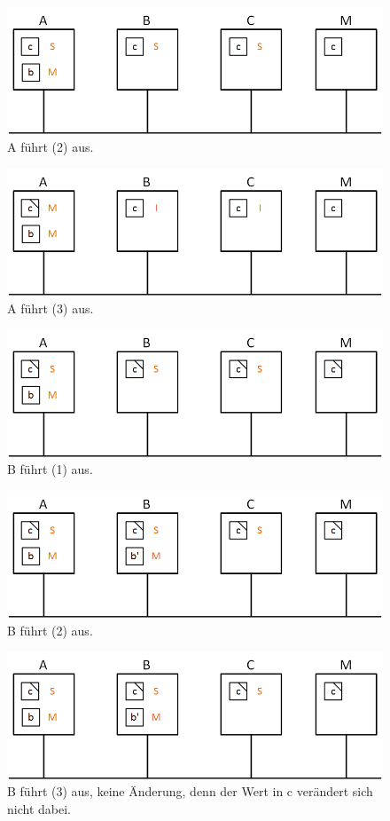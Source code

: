 \begin{figure}[H]
	\begin{center}
		\includegraphics[width=.5\textwidth]{res/mesi_07}
		\caption{A führt (2) aus.}
		\label{pic:mesi07}
	\end{center}
\end{figure} 
\begin{figure}[H]
	\begin{center}
		\includegraphics[width=.5\textwidth]{res/mesi_08}
		\caption{A führt (3) aus.}
		\label{pic:mesi08}
	\end{center}
\end{figure} 
\begin{figure}[H]
	\begin{center}
		\includegraphics[width=.5\textwidth]{res/mesi_09}
		\caption{B führt (1) aus.}
		\label{pic:mesi09}
	\end{center}
\end{figure} 
\begin{figure}[H]
	\begin{center}
		\includegraphics[width=.5\textwidth]{res/mesi_10}
		\caption{B führt (2) aus.}
		\label{pic:mesi10}
	\end{center}
\end{figure} 
\begin{figure}[H]
	\begin{center}
		\includegraphics[width=.5\textwidth]{res/mesi_11}
		\caption{B führt (3) aus, keine Änderung, denn der Wert in c verändert sich nicht dabei.}
		\label{pic:mesi11}
	\end{center}
\end{figure} 

